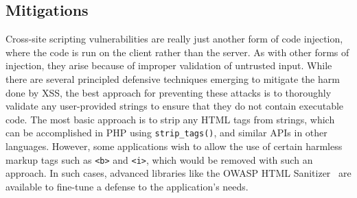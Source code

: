\documentclass[11pt,twoside]{scrartcl}
\begin{document}
\subsection{Mitigations}

Cross-site scripting vulnerabilities are really just another form of code injection, where the code is run on the client rather than the server. As with other forms of injection, they arise because of improper validation of untrusted input. While there are several principled defensive techniques emerging to mitigate the harm done by XSS, the best approach for preventing these attacks is to thoroughly validate any user-provided strings to ensure that they do not contain executable code. The most basic approach is to strip any HTML tags from strings, which can be accomplished in PHP using \verb'strip_tags()', and similar APIs in other languages. However, some applications wish to allow the use of certain harmless markup tags such as \verb'<b>' and \verb'<i>', which would be removed with such an approach. In such cases, advanced libraries like the OWASP HTML Sanitizer~\cite{owasphtml} are available to fine-tune a defense to the application's needs.
\end{document}
